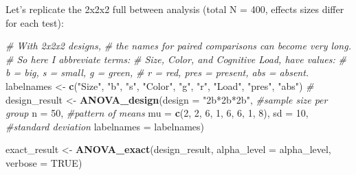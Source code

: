 \documentclass[
]{book}
\newenvironment{Shaded}{\begin{snugshade}}{\end{snugshade}}
\newcommand{\CommentTok}[1]{\textcolor[rgb]{0.56,0.35,0.01}{\textit{#1}}}
\newcommand{\DataTypeTok}[1]{\textcolor[rgb]{0.13,0.29,0.53}{#1}}
\newcommand{\DecValTok}[1]{\textcolor[rgb]{0.00,0.00,0.81}{#1}}
\newcommand{\KeywordTok}[1]{\textcolor[rgb]{0.13,0.29,0.53}{\textbf{#1}}}
\newcommand{\NormalTok}[1]{#1}
\newcommand{\OtherTok}[1]{\textcolor[rgb]{0.56,0.35,0.01}{#1}}
\newcommand{\StringTok}[1]{\textcolor[rgb]{0.31,0.60,0.02}{#1}}
\begin{document}
Let's replicate the 2x2x2 full between analysis (total N = 400, effects sizes differ for each test):

\begin{Shaded}
\begin{Highlighting}[]
\CommentTok{# With 2x2x2 designs,}
\CommentTok{# the names for paired comparisons can become very long.}
\CommentTok{# So here I abbreviate terms:}
\CommentTok{# Size, Color, and Cognitive Load, have values:}
\CommentTok{# b = big, s = small, g = green,}
\CommentTok{# r = red, pres = present, abs = absent.}
\NormalTok{labelnames <-}\StringTok{ }\KeywordTok{c}\NormalTok{(}\StringTok{"Size"}\NormalTok{, }\StringTok{"b"}\NormalTok{, }\StringTok{"s"}\NormalTok{, }\StringTok{"Color"}\NormalTok{, }\StringTok{"g"}\NormalTok{, }\StringTok{"r"}\NormalTok{,}
                \StringTok{"Load"}\NormalTok{, }\StringTok{"pres"}\NormalTok{, }\StringTok{"abs"}\NormalTok{) }\CommentTok{#}
\NormalTok{design_result <-}\StringTok{ }\KeywordTok{ANOVA_design}\NormalTok{(}\DataTypeTok{design =} \StringTok{"2b*2b*2b"}\NormalTok{,}
                              \CommentTok{#sample size per group}
                              \DataTypeTok{n =} \DecValTok{50}\NormalTok{,}
                              \CommentTok{#pattern of means}
                              \DataTypeTok{mu =} \KeywordTok{c}\NormalTok{(}\DecValTok{2}\NormalTok{, }\DecValTok{2}\NormalTok{, }\DecValTok{6}\NormalTok{, }\DecValTok{1}\NormalTok{, }\DecValTok{6}\NormalTok{, }\DecValTok{6}\NormalTok{, }\DecValTok{1}\NormalTok{, }\DecValTok{8}\NormalTok{),}
                              \DataTypeTok{sd =} \DecValTok{10}\NormalTok{, }\CommentTok{#standard deviation}
                              \DataTypeTok{labelnames =}\NormalTok{ labelnames)}

\NormalTok{exact_result <-}\StringTok{ }\KeywordTok{ANOVA_exact}\NormalTok{(design_result,}
                            \DataTypeTok{alpha_level =}\NormalTok{ alpha_level,}
                            \DataTypeTok{verbose =} \OtherTok{TRUE}\NormalTok{)}
\end{Highlighting}
\end{Shaded}
\end{document}

